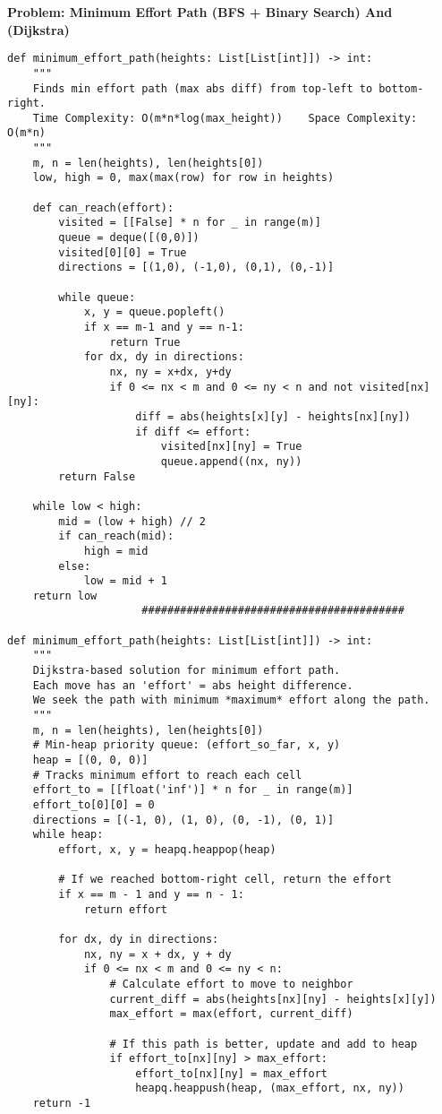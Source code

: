 \noindent\textbf{Problem: Minimum Effort Path (BFS + Binary Search) And (Dijkstra)}
\begin{verbatim}
def minimum_effort_path(heights: List[List[int]]) -> int:
    """
    Finds min effort path (max abs diff) from top-left to bottom-right.
    Time Complexity: O(m*n*log(max_height))    Space Complexity: O(m*n)
    """
    m, n = len(heights), len(heights[0])
    low, high = 0, max(max(row) for row in heights)
    
    def can_reach(effort):
        visited = [[False] * n for _ in range(m)]
        queue = deque([(0,0)])
        visited[0][0] = True
        directions = [(1,0), (-1,0), (0,1), (0,-1)]
        
        while queue:
            x, y = queue.popleft()
            if x == m-1 and y == n-1:
                return True
            for dx, dy in directions:
                nx, ny = x+dx, y+dy
                if 0 <= nx < m and 0 <= ny < n and not visited[nx][ny]:
                    diff = abs(heights[x][y] - heights[nx][ny])
                    if diff <= effort:
                        visited[nx][ny] = True
                        queue.append((nx, ny))
        return False
    
    while low < high:
        mid = (low + high) // 2
        if can_reach(mid):
            high = mid
        else:
            low = mid + 1
    return low
                     #########################################

def minimum_effort_path(heights: List[List[int]]) -> int:
    """
    Dijkstra-based solution for minimum effort path.
    Each move has an 'effort' = abs height difference.
    We seek the path with minimum *maximum* effort along the path.
    """
    m, n = len(heights), len(heights[0])
    # Min-heap priority queue: (effort_so_far, x, y)
    heap = [(0, 0, 0)]    
    # Tracks minimum effort to reach each cell
    effort_to = [[float('inf')] * n for _ in range(m)]
    effort_to[0][0] = 0
    directions = [(-1, 0), (1, 0), (0, -1), (0, 1)]
    while heap:
        effort, x, y = heapq.heappop(heap)

        # If we reached bottom-right cell, return the effort
        if x == m - 1 and y == n - 1:
            return effort
        
        for dx, dy in directions:
            nx, ny = x + dx, y + dy
            if 0 <= nx < m and 0 <= ny < n:
                # Calculate effort to move to neighbor
                current_diff = abs(heights[nx][ny] - heights[x][y])
                max_effort = max(effort, current_diff)
                
                # If this path is better, update and add to heap
                if effort_to[nx][ny] > max_effort:
                    effort_to[nx][ny] = max_effort
                    heapq.heappush(heap, (max_effort, nx, ny))
    return -1  

\end{verbatim}

